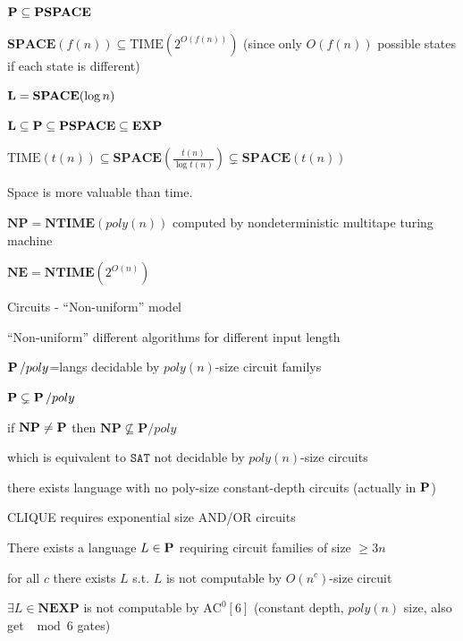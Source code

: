 \documentclass[11pt]{article}
\def \TIME {\text{TIME}}
\def \EXP {\textbf{EXP}}
\def \SPACE {\textbf{SPACE}}
\def \PSPACE {\textbf{PSPACE}}
\def \NTIME {\textbf{NTIME}}
\def \NP {\textbf{NP}}
\def \NEXP {\textbf{NEXP}}
\def \NE {\textbf{NE}}
\def \Pspoly {\textbf{P}/poly}
\def \SAT {\text{SAT}}
\def \AC {\text{AC}}
\def \NP {\textbf{NP}}
\def \SAT {\texttt{SAT}}
\begin{document}
\(\bP\subseteq\PSPACE\)

\(\SPACE(f(n))\subseteq\TIME(2^{O(f(n))})\) (since only \(O(f(n))\) possible states if each state
is different)

\(\bL=\SPACE(\log n)\)

\(\bL\subseteq\bP\subseteq\PSPACE\subseteq\EXP\)

\begin{theorem}[HPV77]
\(\TIME(t(n))\subseteq\SPACE(\frac{t(n)}{\log t(n)})\subsetneq\SPACE(t(n))\)
\end{theorem}

Space is more valuable than time.

\(\NP=\NTIME(poly(n))\) computed by nondeterministic multitape turing machine

\(\NE=\NTIME(2^{O(n)})\)

Circuits - ``Non-uniform'' model

``Non-uniform'' different algorithms for different input length

\(\operatorname{\textbf{P}}/poly\)=langs decidable by \(poly(n)\)-size circuit familys

\(\operatorname{\textbf{P}}\subsetneq\operatorname{\textbf{P}}/poly\)

if \(\NP\neq\bP\) then \(\NP\not\subseteq\Pspoly\)

which is equivalent to \(\SAT\) not decidable by \(poly(n)\)-size circuits

\begin{theorem}[]
there exists language with no poly-size constant-depth circuits (actually in \(\operatorname{\textbf{P}}\))
\end{theorem}

\begin{theorem}[]
CLIQUE requires exponential size AND/OR circuits
\end{theorem}

\begin{theorem}[]
There exists a language \(L\in\operatorname{\textbf{P}}\) requiring circuit families of size \(\ge3 n\)
\end{theorem}


\begin{theorem}
for all \(c\) there exists \(L\) s.t. \(L\) is not computable by \(O(n^c)\)-size circuit
\end{theorem}

\begin{theorem}
\(\exists L\in\NEXP\) is not computable by \(\AC^0[6]\) (constant depth, \(poly(n)\) size, also
get \(\mod6\) gates)
\end{theorem}
\end{document}
